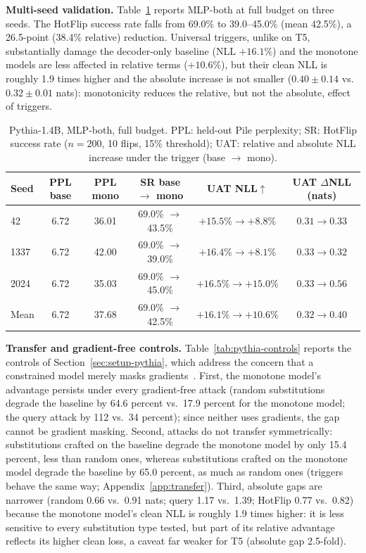 \documentclass{article}
\theoremstyle{plain}
\theoremstyle{definition}
\theoremstyle{remark}
\theoremstyle{plain}
\begin{document}
\textbf{Multi-seed validation.}
Table~\ref{tab:pythia-seeds} reports MLP-both at full budget on three seeds. The HotFlip success rate falls from 69.0\% to 39.0--45.0\% (mean 42.5\%), a 26.5-point (38.4\% relative) reduction. Universal triggers, unlike on T5, substantially damage the decoder-only baseline (NLL $+16.1\%$) and the monotone models are less affected in relative terms ($+10.6\%$), but their clean NLL is roughly 1.9 times higher and the absolute increase is not smaller ($0.40 \pm 0.14$ vs.\ $0.32 \pm 0.01$ nats): monotonicity reduces the relative, but not the absolute, effect of triggers.

\begin{table}[t]
\caption{Pythia-1.4B, MLP-both, full budget. PPL: held-out Pile perplexity; SR: HotFlip success rate ($n = 200$, 10 flips, 15\% threshold); UAT: relative and absolute NLL increase under the trigger (base $\to$ mono).}
\label{tab:pythia-seeds}
\centering
\footnotesize
\begin{tabular}{lccccc}
\toprule
Seed & PPL base & PPL mono & SR base $\to$ mono & UAT NLL$\uparrow$ & UAT $\Delta$NLL (nats) \\
\midrule
42   & 6.72 & 36.01 & 69.0\% $\to$ 43.5\% & $+15.5\% \to +8.8\%$ & $0.31 \to 0.33$ \\
1337 & 6.72 & 42.00 & 69.0\% $\to$ 39.0\% & $+16.4\% \to +8.1\%$ & $0.33 \to 0.32$ \\
2024 & 6.72 & 35.03 & 69.0\% $\to$ 45.0\% & $+16.5\% \to +15.0\%$ & $0.33 \to 0.56$ \\
\midrule
Mean & 6.72 & 37.68 & 69.0\% $\to$ 42.5\% & $+16.1\% \to +10.6\%$ & $0.32 \to 0.40$ \\
\bottomrule
\end{tabular}
\end{table}

\textbf{Transfer and gradient-free controls.}
Table~\ref{tab:pythia-controls} reports the controls of Section~\ref{sec:setup-pythia}, which address the concern that a constrained model merely masks gradients~\citep{athalye2018obfuscated,carlini2019evaluating,tramer2020adaptive}. First, the monotone model's advantage persists under every gradient-free attack (random substitutions degrade the baseline by 64.6 percent vs.\ 17.9 percent for the monotone model; the query attack by 112 vs.\ 34 percent); since neither uses gradients, the gap cannot be gradient masking. Second, attacks do not transfer symmetrically: substitutions crafted on the baseline degrade the monotone model by only 15.4 percent, less than random ones, whereas substitutions crafted on the monotone model degrade the baseline by 65.0 percent, as much as random ones (triggers behave the same way; Appendix~\ref{app:transfer}). Third, absolute gaps are narrower (random 0.66 vs.\ 0.91 nats; query 1.17 vs.\ 1.39; HotFlip 0.77 vs.\ 0.82) because the monotone model's clean NLL is roughly 1.9 times higher: it is less sensitive to every substitution type tested, but part of its relative advantage reflects its higher clean loss, a caveat far weaker for T5 (absolute gap 2.5-fold).
\end{document}
